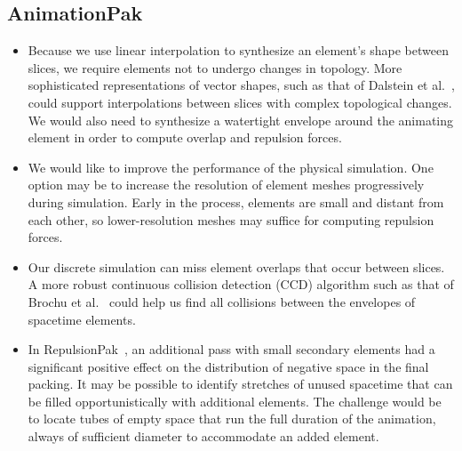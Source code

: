 \subsection{AnimationPak}


\begin{itemize}
\item {}
Because we use linear interpolation to synthesize an element's shape
	between slices, we require elements not to undergo changes in 
	topology.  More sophisticated representations of vector shapes,
	such as that of Dalstein et al.~\cite{Dalstein2015}, could support
	interpolations between slices with complex topological changes.
	We would also need to synthesize a watertight envelope around the
	animating element in order to compute overlap and repulsion forces.

\item {}
We would like to improve the performance of the physical simulation.
	One option may be to increase the resolution of element meshes 
	progressively during simulation.  Early in the process, elements are
	small and distant from each other, so lower-resolution
	meshes may suffice for computing repulsion forces.

\item {}
	Our discrete simulation can miss element overlaps that occur between
	slices.  A more robust continuous collision detection (CCD) algorithm
	such as that of Brochu et al.~\cite{Brochu2012}
	could help us find all collisions between
	the envelopes of spacetime elements.

\item {}
In RepulsionPak~\cite{Saputra2018}, an additional pass with
	small secondary elements had a significant positive effect on the
	distribution of negative space in the final packing.  It may be
	possible to identify stretches of unused spacetime that can be filled
	opportunistically with additional elements.  The challenge would be
	to locate tubes of empty space that run the full duration of the
	animation, always of sufficient diameter to accommodate an added
	element.


\end{itemize}
